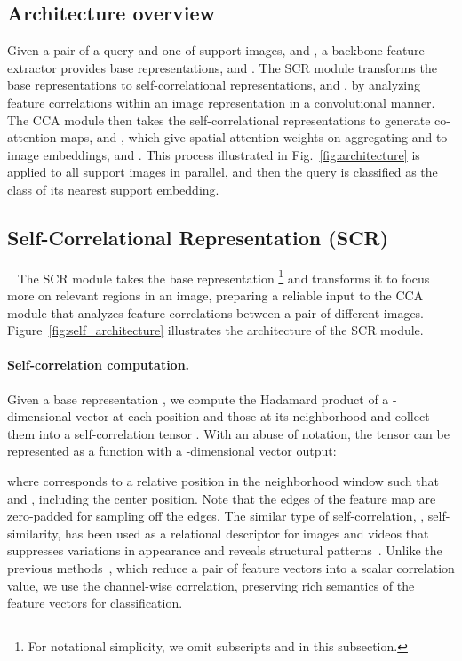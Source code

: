 \documentclass[10pt,twocolumn,letterpaper]{article}
\newcommand{\abbself}{SCR\xspace}
\newcommand{\abbcross}{CCA\xspace}
\begin{document}
\subsection{Architecture overview}
\label{sec_overview}
Given a pair of a query and one of support images,  and , a backbone feature extractor provides base representations,  and .
The SCR module transforms the base representations to self-correlational representations,  and , by analyzing feature correlations within an image representation in a convolutional manner.
The CCA module then takes the self-correlational representations to generate co-attention maps,  and , which give spatial attention weights on aggregating  and  to image embeddings,  and .
This process illustrated in Fig.~\ref{fig:architecture} is applied to all support images  in parallel, and then the query is classified as the class of its nearest support embedding.







\subsection{Self-Correlational Representation (\abbself)}~\label{sec_SCR}
The \abbself module takes the base representation \footnote{For notational simplicity, we omit subscripts  and  in this subsection.} and transforms it to focus more on relevant regions in an image, preparing a reliable input to the \abbcross module that analyzes feature correlations between a pair of different images.
Figure~\ref{fig:self_architecture} illustrates the architecture of the \abbself module.








\paragraph{Self-correlation computation.}
Given a base representation , we compute the Hadamard product of a -dimensional vector at each position  and those at its neighborhood and collect them into a self-correlation tensor . With an abuse of notation, the tensor  can be represented as a function with a -dimensional vector output:

where  corresponds to a relative position in the neighborhood window such that  and , including the center position.
Note that the edges of the feature map are zero-padded for sampling off the edges.
The similar type of self-correlation, \ie, self-similarity, has been used as a relational descriptor for images and videos that suppresses variations in appearance and reveals structural patterns~\cite{shechtman2007matching}.
Unlike the previous methods~\cite{shechtman2007matching, deselaers2010global, junejo2008cross}, which reduce a pair of feature vectors into a scalar correlation value, we use the channel-wise correlation, preserving rich semantics of the feature vectors for classification.
\end{document}
